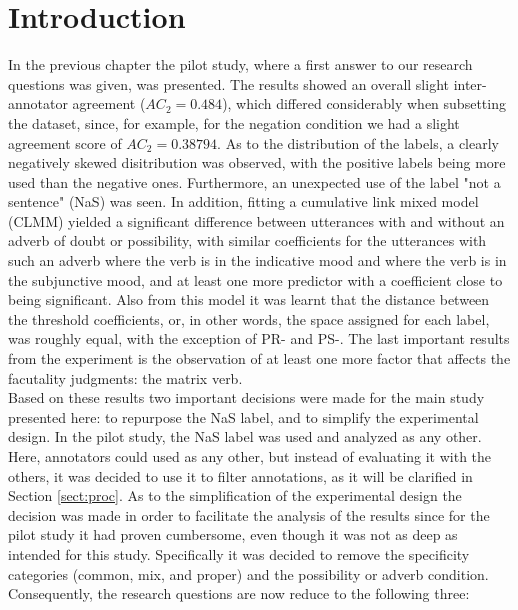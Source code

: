 \label{chap:main}

\section{Introduction}
In the previous chapter the pilot study, where a first answer to our research questions was given, was presented. The results showed an overall slight inter-annotator agreement ($AC_2=0.484$), which differed considerably when subsetting the dataset, since, for example, for the negation condition we had a slight agreement score of $AC_2=0.38794$. As to the distribution of the labels, a clearly negatively skewed disitribution was observed, with the positive labels being more used than the negative ones. Furthermore, an unexpected use of the label "not a sentence" (NaS) was seen. In addition, fitting a cumulative link mixed model (CLMM) yielded a significant difference between utterances with and without an adverb of doubt or possibility, with similar coefficients for the utterances with such an adverb where the verb is in the indicative mood and where the verb is in the subjunctive mood, and at least one more predictor with a coefficient close to being significant. Also from this model it was learnt that the distance between the threshold coefficients, or, in other words, the space assigned for each label, was roughly equal, with the exception of PR- and PS-. The last important results from the experiment is the observation of at least one more factor that affects the facutality judgments: the matrix verb.\\

Based on these results two important decisions were made for the main study presented here: to repurpose the NaS label, and to simplify the experimental design. In the pilot study, the NaS label was used and analyzed as any other. Here, annotators could used as any other, but instead of evaluating it with the others, it was decided to use it to filter annotations, as it will be clarified in Section \ref{sect:proc}. As to the simplification of the experimental design the decision was made in order to facilitate the analysis of the results since for the pilot study it had proven cumbersome, even though it was not as deep as intended for this study. Specifically it was decided to remove the specificity categories (common, mix, and proper) and the possibility or adverb condition. Consequently, the research questions are now reduce to the following three:\\

